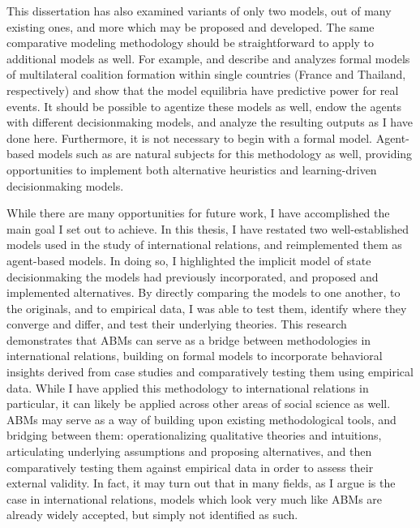 This dissertation has also examined variants of only two models, out of many existing ones, and more which may be proposed and developed. The same comparative modeling methodology should be straightforward to apply to additional models as well. For example, \citet{tsebelis_1988} and \citet{metternich_2013} describe and analyzes formal models of multilateral coalition formation within single countries (France and Thailand, respectively) and show that the model equilibria have predictive power for real events. It should be possible to agentize these models as well, endow the agents with different decisionmaking models, and analyze the resulting outputs as I have done here. Furthermore, it is not necessary to begin with a formal model. Agent-based models such as \citet{cederman_1997} are natural subjects for this methodology as well, providing opportunities to implement both alternative heuristics and learning-driven decisionmaking models. 

While there are many opportunities for future work, I have accomplished the main goal I set out to achieve. In this thesis, I have restated two well-established models used in the study of international relations, and reimplemented them as agent-based models. In doing so, I highlighted the implicit model of state decisionmaking the models had previously incorporated, and proposed and implemented alternatives. By directly comparing the models to one another, to the originals, and to empirical data, I was able to test them, identify where they converge and differ, and test their underlying theories. This research demonstrates that ABMs can serve as a bridge between methodologies in international relations, building on formal models to incorporate behavioral insights derived from case studies and comparatively testing them using empirical data. While I have applied this methodology to international relations in particular, it can likely be applied across other areas of social science as well. ABMs may serve as a way of building upon existing methodological tools, and bridging between them: operationalizing qualitative theories and intuitions, articulating underlying assumptions and proposing alternatives, and then comparatively testing them against empirical data in order to assess their external validity. In fact, it may turn out that in many fields, as I argue is the case in international relations, models which look very much like ABMs are already widely accepted, but simply not identified as such.